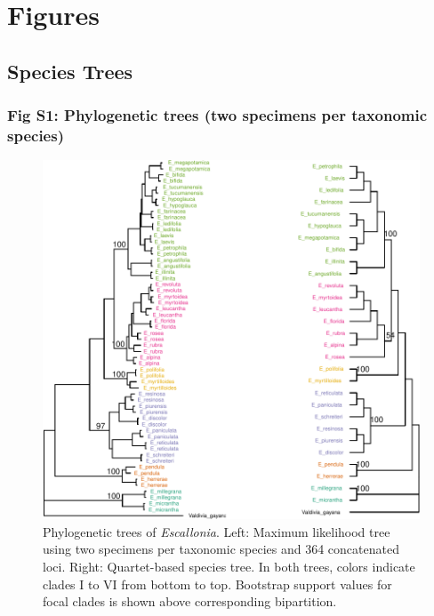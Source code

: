 \documentclass[
  11pt,
]{article}
\begin{document}
\hypertarget{figures}{%
\section{Figures}\label{figures}}

\hypertarget{species-trees}{%
\subsection{Species Trees}\label{species-trees}}

\hypertarget{fig-s1-phylogenetic-trees-two-specimens-per-taxonomic-species}{%
\subsubsection{Fig S1: Phylogenetic trees (two specimens per taxonomic species)}\label{fig-s1-phylogenetic-trees-two-specimens-per-taxonomic-species}}

\begin{figure}
\includegraphics{Supplementary_Material_files/figure-latex/EscalloniaSpeciesTreeTrimmedPlot-1} \caption{Phylogenetic trees of \textit{Escallonia}. Left: Maximum likelihood tree using two specimens per taxonomic species and 364 concatenated loci. Right: Quartet-based species tree. In both trees, colors indicate clades I to VI from bottom to top. Bootstrap support values for focal clades is shown above corresponding bipartition.}\label{fig:EscalloniaSpeciesTreeTrimmedPlot}
\end{figure}
\end{document}
